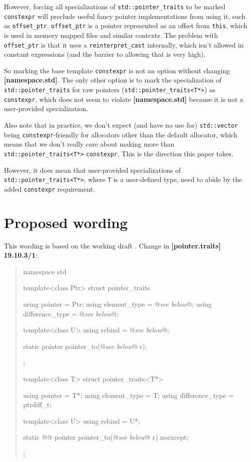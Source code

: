 \documentclass{wg21}
\newcommand{\cc}[1]{\texttt{#1}}
\begin{document}
However, forcing all specializations of \cc{std::pointer_traits} to be marked
\cc{constexpr} will preclude useful fancy pointer implementations from using
it, such as \cc{offset_ptr}. \cc{offset_ptr} is a pointer represented as an
offset from \cc{this}, which is used in memory mapped files and similar
contexts. The problem with \cc{offset_ptr} is that it uses a \cc{reinterpret_cast}
internally, which isn't allowed in constant expressions (and the barrier to
allowing that is very high).

So marking the base template \cc{constexpr} is not an option without changing
\textbf{[namespace.std]}. The only other option is to mark the specialization
of \cc{std::pointer_traits} for raw pointers (\cc{std::pointer_traits<T*>}) as
\cc{constexpr}, which does not seem to violate \textbf{[namespace.std]} because
it is not a user-provided specialization.

Also note that in practice, we don't expect (and have no use for) \cc{std::vector}
being \cc{constexpr}-friendly for allocators other than the default allocator,
which means that we don't really care about making more than \cc{std::pointer_traits<T*>}
\cc{constexpr}. This is the direction this paper takes.

However, it does mean that user-provided specializations of \cc{std::pointer_traits<T*>},
where \cc{T} is a user-defined type, need to abide by the added \cc{constexpr}
requirement.


\section{Proposed wording}
This wording is based on the working draft \cite{N4762}.
Change in \textbf{[pointer.traits] 19.10.3/1}:
\begin{quote}
\begin{codeblock}
namespace std {
  template<class Ptr> struct pointer_traits {
    using pointer         = Ptr;
    using element_type    = @\textit{see below}@;
    using difference_type = @\textit{see below}@;

    template<class U> using rebind = @\textit{see below}@;

    static pointer pointer_to(@\textit{see below}@ r);
  };

  template<class T> struct pointer_traits<T*> {
    using pointer         = T*;
    using element_type    = T;
    using difference_type = ptrdiff_t;

    template<class U> using rebind = U*;

    static @@ pointer pointer_to(@\textit{see below}@ r) noexcept;
  };
}
\end{codeblock}
\end{quote}
\end{document}
